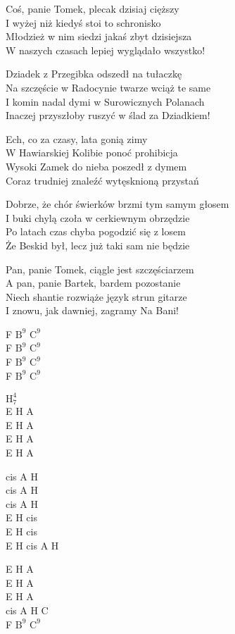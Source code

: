 \begin{text}
\begin{scriptTwelve}
    Coś, panie Tomek, plecak dzisiaj cięższy\\
    I wyżej niż kiedyś stoi to schronisko\\
    Młodzież w nim siedzi jakaś zbyt dzisiejsza\\
    W naszych czasach lepiej wyglądało wszystko!

    Dziadek z Przegibka odszedł na tułaczkę\\
    Na szczęście w Radocynie twarze wciąż te same\\
    I komin nadal dymi w Surowicznych Polanach\\
    Inaczej przyszłoby ruszyć w ślad za Dziadkiem!

    Ech, co za czasy, lata gonią zimy\\
    W Hawiarskiej Kolibie ponoć prohibicja\\
    Wysoki Zamek do nieba poszedł z dymem\\
    Coraz trudniej znaleźć wytęsknioną przystań

    Dobrze, że chór świerków brzmi tym samym głosem\\
    I buki chylą czoła w cerkiewnym obrzędzie\\
    Po latach czas chyba pogodzić się z losem\\
    Że Beskid był, lecz już taki sam nie będzie

    Pan, panie Tomek, ciągle jest szczęściarzem\\
    A pan, panie Bartek, bardem pozostanie\\
    Niech shantie rozwiąże język strun gitarze\\
    I znowu, jak dawniej, zagramy Na Bani!
\end{scriptTwelve}
\end{text}
\begin{chord}
    \begin{scriptTwelve}
    F $\mathrm{B^9}$ $\mathrm{C^9}$\\
    F $\mathrm{B^9}$ $\mathrm{C^9}$\\
    F $\mathrm{B^9}$ $\mathrm{C^9}$\\
    F $\mathrm{B^9}$ $\mathrm{C^9}$

    \hfill\break
    \hfill\break
    \hfill\break
    \hfill\break
    \hfill\break
    \hfill\break
    \hfill\break
    \hfill\break
    \hfill\break
    $\mathrm{H_7^4}$\\
    E H A\\
    E H A\\
    E H A\\
    E H A

    cis A H\\
    cis A H\\
    cis A H\\
    E H cis\\
    E H cis\\
    E H cis A H

    E H A\\
    E H A\\
    E H A\\
    cis A H C\\
    F $\mathrm{B^9}$ $\mathrm{C^9}$
\end{scriptTwelve}
\end{chord}
